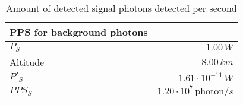 \begin{table}[H]
\centering
\caption{Amount of detected signal photons detected per second}
\label{tab:PPS_S}
\begin{tabular}{|l|r|}\hline
    \textbf{PPS for background photons} & \\
    \hline 
    $P_S$ & $1.00\,W$ \\
    Altitude & $8.00\, km$ \\
    $P'_S$ & $1.61\cdot10^{-11}\,W$ \\
    $PPS_S$ & $1.20\cdot10^{7}\,\text{photon}/s$ \\
    \hline 
\end{tabular}
\end{table}

